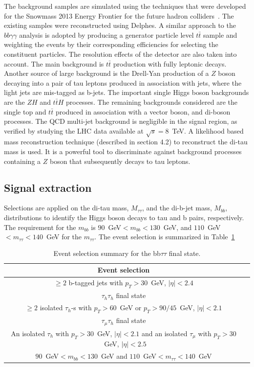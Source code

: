 The background samples are simulated using the techniques that were developed for the Snowmass 2013 Energy Frontier for the future hadron colliders~\cite{Avetisyan}. The existing samples were reconstructed using Delphes. A similar approach to the $bb\gamma\gamma$ analysis is adopted by producing a generator particle level $t\bar{t}$ sample and weighting the events by their corresponding efficiencies for selecting the constituent particles. The resolution effects of the detector are also taken into account. The main background is $t\bar{t}$ production with fully leptonic decays. Another source of large background is the Drell-Yan
production of a $Z$ boson decaying into a pair of tau leptons
produced in association with jets, where the light jets are mis-tagged as b-jets. The important single Higgs boson backgrounds are the $ZH$ and  $t\bar{t}H$ processes. The remaining backgrounds considered are the single top and $t\bar{t}$ produced in association with a vector boson, and di-boson processes.
The QCD multi-jet background is negligible in the signal region, as verified by studying the LHC data available at $\sqrt{s} = 8$~TeV. A likelihood based mass reconstruction technique (described in section 4.2) to reconstruct the di-tau mass is used. It is a powerful tool to discriminate against background processes containing a $Z$ boson that subsequently decays to tau leptons. 

\subsection {Signal extraction}
 Selections are applied on the di-tau mass, $M_{\tau\tau}$, and the di-b-jet mass, $M_{bb}$, distributions to identify
the Higgs boson decays to tau and b pairs, respectively. The requirement for the $m_{bb}$ is $90$~GeV$<m_{bb}<130$~GeV, and
$110$~GeV$<m_{\tau\tau}<140$~GeV for the $m_{\tau\tau}$. The event selection is summarized in Table~\ref{tab:event_selection} 

\begin{table}[!ht]
\begin{center} 
\begin{tabular}{|c|c|}
\hline
Event selection                                    \\ \hline
$\geq 2$ b-tagged jets with $p_{T}>30$~GeV, $|\eta|<2.4$ \\ \hline
$\tau_{h}\tau_{h}$ final state                     \\ 
$\geq 2$ isolated $\tau_{h}$-s with $p_{T}>60$~GeV or $p_{T}>90/45$~GeV, $|\eta|<2.1$  \\ \hline
$\tau_{\mu}\tau_{h}$ final state                     \\ 
An isolated $\tau_{h}$ with $p_{T}>30$~GeV, $|\eta|<2.1$ and an isolated $\tau_{\mu}$ with  $p_{T}>30$~GeV, $|\eta|<2.5$ \\ \hline 
 $90$~GeV$<m_{bb}<130$~GeV and $110$~GeV$<m_{\tau\tau}<140$~GeV \\ \hline
\end{tabular}
\caption{ Event selection summary for the bb$\tau\tau$ final state.}
\label{tab:event_selection}
\end{center}
\end{table}

